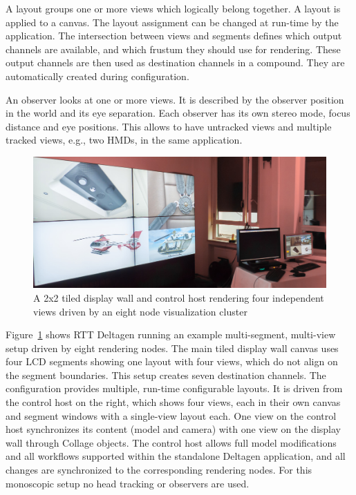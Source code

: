 \documentclass[10pt,journal,compsoc]{IEEEtran}
\newcommand{\fig}[1]{Figure~\ref{#1}}
\begin{document}
A layout groups one or more views which logically belong together. A layout is
applied to a canvas. The layout assignment can be changed at run-time by the
application. The intersection between views and segments defines which output
channels are available, and which frustum they should use for rendering. These
output channels are then used as destination channels in a compound. They are
automatically created during configuration.

\label{sec:observer}
An observer looks at one or more views. It is described by the observer position
in the world and its eye separation. Each observer has its own stereo
mode, focus distance and eye positions. This allows to have untracked
views and multiple tracked views, e.g., two HMDs, in the same application.

\begin{figure}[ht]\center
  \includegraphics[width=\columnwidth]{images/layout}
  \caption{\label{fLayout}A 2x2 tiled display wall and control host rendering four independent views driven by an eight node visualization cluster}
\end{figure}

\fig{fLayout} shows RTT Deltagen running an example multi-segment, multi-view
setup driven by eight rendering nodes. The main tiled display wall canvas uses
four LCD segments showing one layout with four views, which do not align on the
segment boundaries. This setup creates seven destination channels. The
configuration provides multiple, run-time configurable layouts. It is driven
from the control host on the right, which shows four views, each in their own
canvas and segment windows with a single-view layout each. One view on the
control host synchronizes its content (model and camera) with one view on the
display wall through Collage objects. The control host allows full model
modifications and all workflows supported within the standalone Deltagen
application, and all changes are synchronized to the corresponding rendering
nodes. For this monoscopic setup no head tracking or observers are used.
\end{document}

